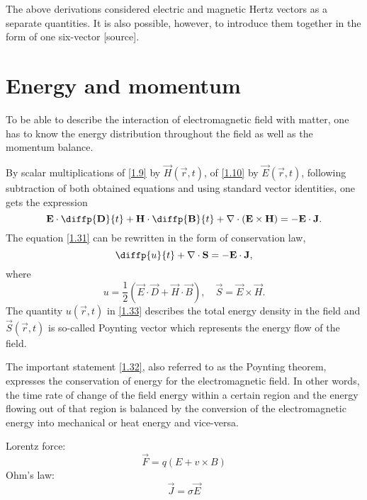 The above derivations considered electric and magnetic Hertz vectors as a separate quantities. It is also possible, however, to introduce them together in the form of one six-vector [source].

\section{Energy and momentum}
To be able to describe the interaction of electromagnetic field with matter, one has to know the energy distribution throughout the field as well as the momentum balance.

By scalar multiplications of \ref{1.9} by $ \vec{H}\left( \vec{r}, t \right) $, of \ref{1.10} by $ \vec{E}\left( \vec{r}, t \right) $, following subtraction of both obtained equations and using standard vector identities, one gets the expression 
\begin{equation}
\label{1.31}
\vec{E} \cdot \diffp{\vec{D}}{t} + \vec{H} \cdot \diffp{\vec{B}}{t} + \div{\left(\vec{E} \times \vec{H} \right)} = -\vec{E} \cdot \vec{J}.
\end{equation}
The equation \ref{1.31} can be rewritten in the form of conservation law,
\begin{equation}
\label{1.32}
\diffp{u}{t} + \div{\vec{S}} = - \vec{E} \cdot \vec{J},
\end{equation}
where
\begin{equation}
\label{1.33}
u = \frac{1}{2} \left(\vec{E} \cdot \vec{D} + \vec{H} \cdot \vec{B} \right), \quad \vec{S} = \vec{E} \times \vec{H}.
\end{equation}
The quantity $ u\left( \vec{r}, t \right) $ in \ref{1.33} describes the total energy density in the field and $ \vec{S}\left( \vec{r}, t \right) $ is so-called Poynting vector which represents the energy flow of the field.

The important statement \ref{1.32}, also referred to as the Poynting theorem, expresses the conservation of energy for the electromagnetic field. In other words, the time rate of change of the field energy within a certain region and the energy flowing out of that region is balanced by the conversion of the electromagnetic energy into mechanical or heat energy and vice-versa.

Lorentz force:
\begin{equation}
\vec{F} = q \left(E + v \times B \right) 
\end{equation}
Ohm's law:
\begin{equation}
\vec{J} = \sigma \vec{E}
\end{equation}

